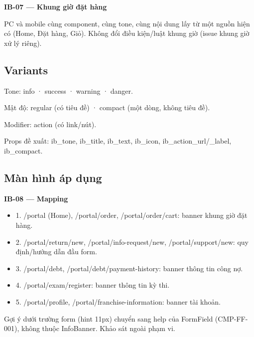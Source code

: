 \documentclass[11pt,a4paper]{report}
\begin{document}
\par\smallskip\textbf{IB-07 — Khung giờ đặt hàng}\par
PC và mobile cùng component, cùng tone, cùng nội dung lấy từ một nguồn hiện có (Home, Đặt hàng, Giỏ). Không đổi điều kiện/\allowbreak{}luật khung giờ (issue khung giờ xử lý riêng).\par
\subsection*{Variants}
Tone: info · success · warning · danger.\par
Mật độ: regular (có tiêu đề) · compact (một dòng, không tiêu đề).\par
Modifier: action (có link/\allowbreak{}nút).\par
Props đề xuất: ib\_tone, ib\_title, ib\_text, ib\_icon, ib\_action\_url/\allowbreak{}\_label, ib\_compact.\par
\subsection*{Màn hình áp dụng}
\par\smallskip\textbf{IB-08 — Mapping}\par
\begin{itemize}[label={}]
\item 1. /portal (Home), /portal/\allowbreak{}order, /portal/\allowbreak{}order/\allowbreak{}cart: banner khung giờ đặt hàng.
\item 2. /portal/\allowbreak{}return/\allowbreak{}new, /portal/\allowbreak{}info-\allowbreak{}request/\allowbreak{}new, /portal/\allowbreak{}support/\allowbreak{}new: quy định/\allowbreak{}hướng dẫn đầu form.
\item 3. /portal/\allowbreak{}debt, /portal/\allowbreak{}debt/\allowbreak{}payment-\allowbreak{}history: banner thông tin công nợ.
\item 4. /portal/\allowbreak{}exam/\allowbreak{}register: banner thông tin kỳ thi.
\item 5. /portal/\allowbreak{}profile, /portal/\allowbreak{}franchise-\allowbreak{}information: banner tài khoản.
\end{itemize}
Gợi ý dưới trường form (hint 11px) chuyển sang help của FormField (CMP-FF-001), không thuộc InfoBanner. Khảo sát ngoài phạm vi.\par
\end{document}
